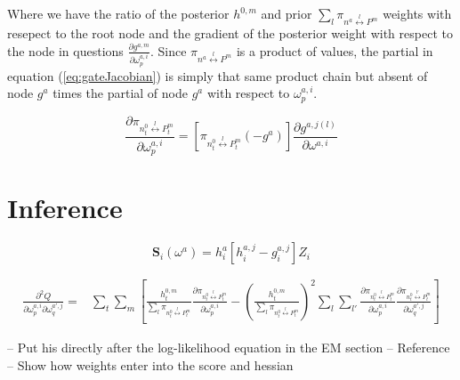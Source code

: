 \documentclass[12pt]{article}
\begin{document}
Where we have the ratio of the posterior $h^{0,m}$ and prior 
$\sum_{l} \pi_{n^{a} \overset{l}{\longleftrightarrow} P^{m}}$ weights with resepect
to the root node and the gradient of the posterior weight with respect to the node
in questions $\frac{\partial g^{a,m}}{\partial \omega^{a,i}_{p}}$. Since
$\pi_{n^{a} \overset{l}{\longleftrightarrow} P^{m}}$ is a product of values, the
partial in equation (\ref{eq:gateJacobian}) is simply that same product chain but
absent of node $g^a$ times the partial of node $g^a$ with respect to
$\omega^{a,i}_{p}$.

\begin{equation} \label{eq:gatechainpartial}
  \frac{\partial \pi_{n^{0}_{t} \overset{l}{\longleftrightarrow} P^{m}_{t}}}{\partial \omega^{a,i}_{p}} = [\pi_{n^{0}_{t} \overset{l}{\longleftrightarrow} P^{m}_{t}} (-g^{a})] \frac{\partial g^{a, j(l)}}{\partial \omega^{a, i}}
\end{equation}





\section{Inference} \label{sec:Inference}

\begin{equation} \label{eq:gateScore}
  \boldsymbol{S}_{i}(\omega^{a}) = h^{a}_{i} \left[h^{a, j}_{i} - g^{a, j}_{i} \right] Z_{i}
\end{equation}


\begin{equation} \label{eq:gateHessian}
  \begin{split}
    \frac{\partial^{2} Q}{\partial \omega^{a,i}_{p} \partial \omega^{a',j}_{q}} =& \sum_{t} \sum_{m} \left[  \frac{h^{0,m}_{t}}{\sum_{l} \pi_{n^{0}_{t} \overset{l}{\longleftrightarrow} P^{m}_{t}}} \frac{\partial \pi_{n^{0}_{t} \overset{l}{\longleftrightarrow} P^{m}_{t}}}{\partial \omega^{a,i}_{p}} - \left( \frac{h^{0,m}_{t}}{\sum_{l} \pi_{n^{0}_{t} \overset{l}{\longleftrightarrow} P^{m}_{t}}} \right)^{2} \sum_{l} \sum_{l'} \frac{\partial \pi_{n^{0}_{t} \overset{l}{\longleftrightarrow} P^{m}_{t}}}{\partial \omega^{a,i}_{p}}  \frac{\partial \pi_{n^{0}_{t} \overset{l'}{\longleftrightarrow} P^{m}_{t}}}{\partial \omega^{a',j}_{q}} \right]
  \end{split}
\end{equation}

-- Put his directly after the log-likelihood equation in the EM section
-- Reference \cite{MengRubinSEM1991}
-- Show how weights enter into the score and hessian
\end{document}
